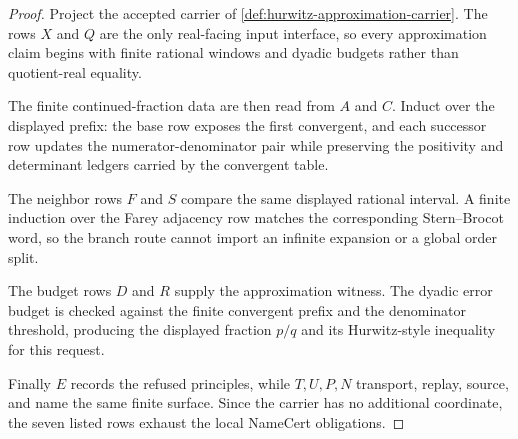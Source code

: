 \begin{proof}
Project the accepted carrier of \autoref{def:hurwitz-approximation-carrier}. The rows $X$ and $Q$ are the only real-facing input interface, so every approximation claim begins with finite rational windows and dyadic budgets rather than quotient-real equality.

The finite continued-fraction data are then read from $A$ and $C$. Induct over the displayed prefix: the base row exposes the first convergent, and each successor row updates the numerator-denominator pair while preserving the positivity and determinant ledgers carried by the convergent table.

The neighbor rows $F$ and $S$ compare the same displayed rational interval. A finite induction over the Farey adjacency row matches the corresponding Stern--Brocot word, so the branch route cannot import an infinite expansion or a global order split.

The budget rows $D$ and $R$ supply the approximation witness. The dyadic error budget is checked against the finite convergent prefix and the denominator threshold, producing the displayed fraction $p/q$ and its Hurwitz-style inequality for this request.

Finally $E$ records the refused principles, while $T,U,P,N$ transport, replay, source, and name the same finite surface. Since the carrier has no additional coordinate, the seven listed rows exhaust the local NameCert obligations.
\end{proof}

